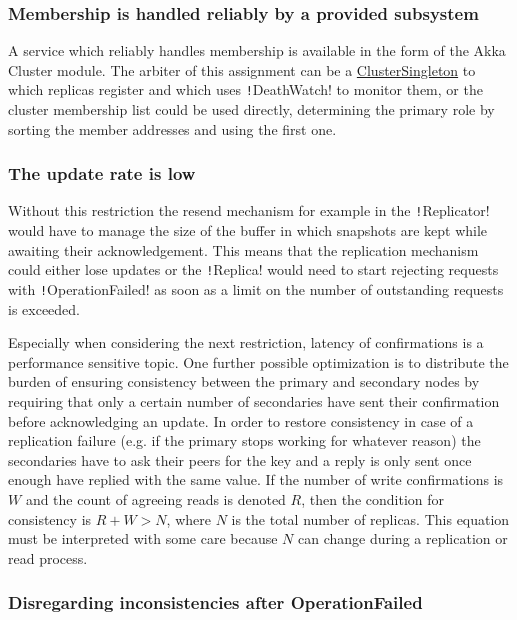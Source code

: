 \documentclass{article}
\begin{document}
\subsubsection{Membership is handled reliably by a provided subsystem}

A service which reliably handles membership is available in the form  of the Akka Cluster module. The arbiter of this assignment can be a 
\href{http://doc.akka.io/docs/akka/2.2.3/scala/cluster-usage.html#Cluster_Singleton_Pattern}{ClusterSingleton}
  to which replicas register and which uses \texttt!DeathWatch! to monitor them,  or the cluster membership list could be used directly, determining the  primary role by sorting the member addresses and using the first one.

  \subsubsection{The update rate is low}

Without this restriction the resend mechanism for example in the \texttt!Replicator! would have to manage the size of the buffer in which snapshots are kept while awaiting their acknowledgement. This means that the replication mechanism could either lose updates or the \texttt!Replica! would need to start rejecting requests with \texttt!OperationFailed! as soon as a limit on the number of outstanding requests is exceeded.

Especially when considering the next restriction, latency of confirmations is a performance sensitive  topic. One further possible optimization is to distribute the burden of  ensuring consistency between the primary and secondary nodes by  requiring that only a certain number of secondaries have sent their  confirmation before acknowledging an update. In order to restore  consistency in case of a replication failure (e.g. if the primary stops  working for whatever reason) the secondaries have to ask their peers for  the key and a reply is only sent once enough have replied with the same  value. If the number of write confirmations is $W$ and the count of  agreeing reads is denoted $R$, then the condition for consistency is  $R+W>N$, where $N$ is the total number of replicas. This equation must be  interpreted with some care because $N$ can change during a replication or read process.

\subsubsection{Disregarding inconsistencies after OperationFailed}
\end{document}

